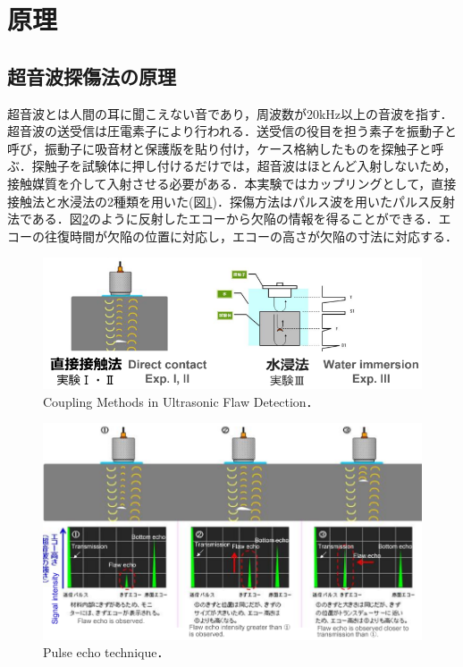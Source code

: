\section{原理}

\subsection{超音波探傷法の原理}
超音波とは人間の耳に聞こえない音であり，周波数が20kHz以上の音波を指す．超音波の送受信は圧電素子により行われる．送受信の役目を担う素子を振動子と呼び，振動子に吸音材と保護版を貼り付け，ケース格納したものを探触子と呼ぶ．探触子を試験体に押し付けるだけでは，超音波はほとんど入射しないため，接触媒質を介して入射させる必要がある．本実験ではカップリングとして，直接接触法と水浸法の2種類を用いた(図\ref{fig:カップリング})．探傷方法はパルス波を用いたパルス反射法である．図\ref{fig:パルス反射法}のように反射したエコーから欠陥の情報を得ることができる．エコーの往復時間が欠陥の位置に対応し，エコーの高さが欠陥の寸法に対応する．

\begin{figure}[htbp]
    \centering %
    \includegraphics[width=100truemm,clip]{fig/fig_測定方式.png}
    \caption{Coupling Methods in Ultrasonic Flaw Detection．}
    \label{fig:カップリング}
\end{figure}

\begin{figure}[htbp]
    \centering %
    \includegraphics[width=100truemm,clip]{fig/fig_探傷法.png}
    \caption{Pulse echo technique．}
    \label{fig:パルス反射法}
\end{figure}

